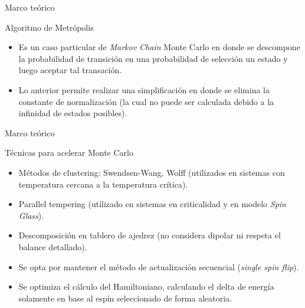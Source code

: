 \begin{frame}{Marco teórico}
\begin{block}{Algoritmo de Metrópolis}
\begin{itemize}
  \item Es un caso particular de \textit{Markov Chain} Monte Carlo en donde se descompone la probabilidad de transición en una probabilidad de selección un estado y luego aceptar tal transación.
  \item Lo anterior permite realizar una simplificación en donde se elimina la constante de normalización (la cual no puede ser calculada debido a la infinidad de estados posibles).

\end{itemize}
	\centerline{}
\end{block}
\end{frame}

\begin{frame}{Marco teórico}
\begin{block}{Técnicas para acelerar Monte Carlo}
\begin{itemize}
  \item Métodos de clustering: Swendsen-Wang, Wolff (utilizados en sistemas con temperatura cercana a la temperatura crítica).
  \item Parallel tempering (utilizado en sistemas en criticalidad y en modelo \textit{Spin Glass}).
  \item Descomposición en tablero de ajedrez (no considera dipolar ni respeta el balance detallado).
  \item Se opta por mantener el método de actualización secuencial (\textit{single spin flip}).
  \item Se optimiza el cálculo del Hamiltoniano, calculando el delta de energía solamente en base al espín seleccionado de forma aleatoria.
\end{itemize}
\end{block}
\end{frame}